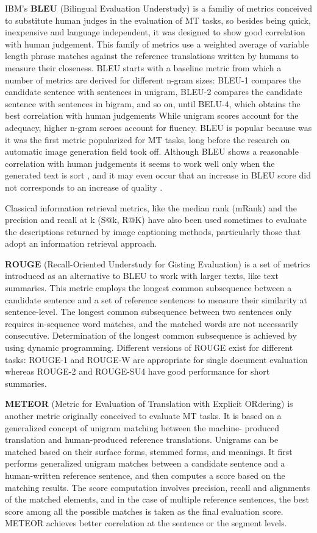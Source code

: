 IBM's \textbf{BLEU} (Bilingual Evaluation Understudy) \citep{Papineni2002} is a familiy of metrics conceived to substitute human judges in the evaluation of MT tasks, so besides being quick, inexpensive and language independent, it was designed to show good correlation with human judgement. This family of metrics use a weighted average of variable length phrase matches against the reference translations written by humans to measure their closeness. BLEU starts with a baseline metric from which a number of metrics are derived for different n-gram sizes: BLEU-1 compares the candidate sentence with sentences in unigram, BLEU-2 compares the candidate sentence with sentences in bigram, and so on, until BELU-4, which obtains the best correlation with human judgements While unigram scores account for the adequacy, higher n-gram scroes account for fluency. BLEU is popular because was it was the first metric popularized for MT tasks, long before the research on automatic image generation field took off. Although BLEU shows a reasonable correlation with human judgements it seems to work well only when the generated text is sort  \citep{Callison-Burch2006}, and it may even occur that an increase in BLEU score did not corresponds to an increase of quality \citep{Lin2004b}.

Classical information retrieval metrics, like the median rank (mRank) and the precision and recall at k (S@k, R@K) have also been used sometimes to evaluate the descriptions returned by image captioning methods, particularly those that adopt an information retrieval approach. 

\textbf{ROUGE} (Recall-Oriented Understudy for Gisting Evaluation) \citep{Lin2004a} is a set of metrics introduced as an alternative to BLEU to work with larger texts, like text summaries. This metric employs the longest common subsequence between a candidate sentence and a set of reference sentences to measure their similarity at sentence-level. The longest common subsequence between two sentences only requires in-sequence word matches, and the matched words are not necessarily consecutive. Determination of the longest common subsequence is achieved by using dynamic programming. Different versions of ROUGE exist for different tasks: ROUGE-1 and ROUGE-W are appropriate for single document evaluation whereas ROUGE-2 and ROUGE-SU4 have good performance for short summaries. 

\textbf{METEOR} (Metric for Evaluation of Translation with Explicit ORdering) \citep{Banerjee2005} is another metric originally conceived to evaluate MT tasks. It is based on a generalized concept of unigram matching between the machine- produced translation and human-produced reference translations. Unigrams can be matched based on their surface forms, stemmed forms, and meanings. It first performs generalized unigram matches between a candidate sentence and a human-written reference sentence, and then computes a score based on the matching results. The score computation involves precision, recall and alignments of the matched elements, and in the case of multiple reference sentences, the best score among all the possible matches is taken as the final evaluation score. METEOR achieves better correlation at the sentence or the segment levels.

